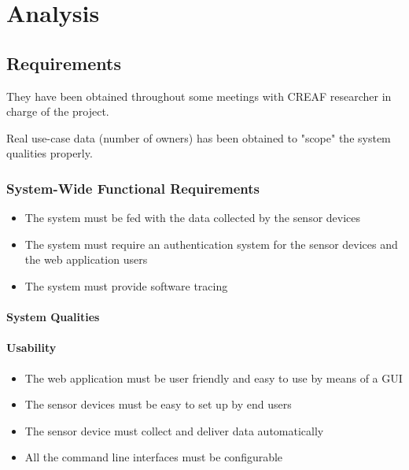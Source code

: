 \chapter{Analysis}

\section{Requirements}
They have been obtained throughout some meetings with CREAF researcher in charge of the project.

Real use-case data (number of owners) has been obtained to "scope" the system qualities properly.

\subsection{System-Wide Functional Requirements}

\begin{itemize}
	\item The system must be fed with the data collected by the sensor devices
	\item The system must require an authentication system for the sensor devices and the web application users
	\item The system must provide software tracing
\end{itemize}

\subsubsection{System Qualities}

\subsubsection{Usability}

\begin{itemize}
	\item The web application must be user friendly and easy to use by means of a GUI
	\item The sensor devices must be easy to set up by end users
	\item The sensor device must collect and deliver data automatically
	\item All the command line interfaces must be configurable
\end{itemize}


